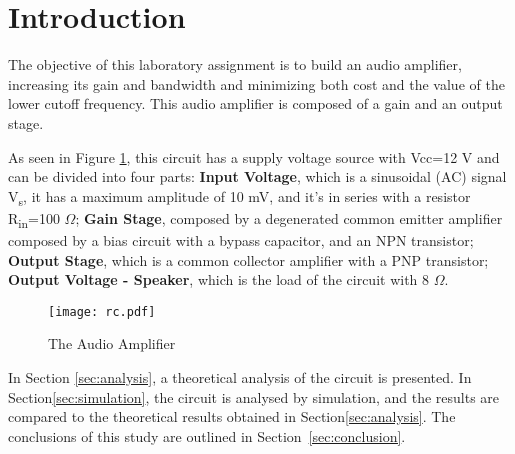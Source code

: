 \section{Introduction}
\label{sec:introduction}

The objective of this laboratory assignment is to build an audio amplifier, increasing its gain and bandwidth and minimizing both cost and the value of the lower cutoff frequency. This audio amplifier is composed of a gain and an output stage.

As seen in Figure \ref{fig:rc}, this circuit has a supply voltage source with Vcc=12 V and can be divided into four parts: \textbf{Input Voltage}, which is a sinusoidal (AC) signal V\textsubscript s, it has a maximum amplitude of 10 mV, and it's in series with a resistor R\textsubscript{in}=100 $\Omega$; \textbf{Gain Stage}, composed by a degenerated common emitter amplifier composed by a bias circuit with a bypass capacitor, and an NPN transistor; \textbf{Output Stage}, which is a common collector amplifier with a PNP transistor; \textbf{Output Voltage - Speaker}, which is the load of the circuit with 8 $\Omega$.


\begin{figure}[h] \centering
\texttt{[image: rc.pdf]}
\vspace{-5mm}
\caption{The Audio Amplifier}\label{fig:rc}
\end{figure}



In Section \ref{sec:analysis}, a theoretical analysis of the circuit is presented. In Section\ref{sec:simulation}, the circuit is analysed by simulation, and the results are compared to the theoretical results obtained in Section\ref{sec:analysis}. The conclusions of this study are outlined in Section~\ref{sec:conclusion}.





